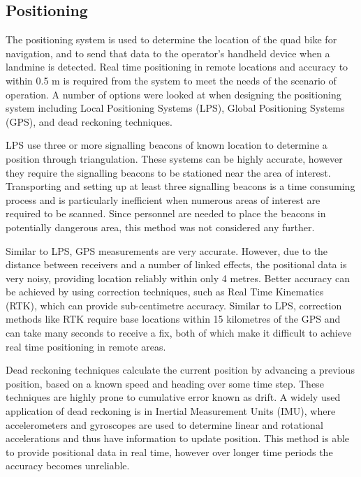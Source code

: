 \documentclass[main.tex]{subfiles}
\begin{document}
\subsection{Positioning}
The positioning system is used to determine the location of the quad bike for navigation, and to send that data to the operator's handheld device when a landmine is detected. Real time positioning in remote locations and accuracy to within 0.5 m is required from the system to meet the needs of the scenario of operation. A number of options were looked at when designing the positioning system including Local Positioning Systems (LPS), Global Positioning Systems (GPS), and dead reckoning techniques.
%
%

LPS use three or more signalling beacons of known location to determine a position through triangulation. These systems can be highly accurate, however they require the signalling beacons to be stationed near the area of interest. Transporting and setting up at least three signalling beacons is a time consuming process and is particularly inefficient when numerous areas of interest are required to be scanned. Since personnel are needed to place the beacons in potentially dangerous area, this method was not considered any further. 

Similar to LPS, GPS measurements are very accurate. However, due to the distance between receivers and a number of linked effects, the positional data is very noisy, providing location reliably within only 4 metres. Better accuracy can be achieved by using correction techniques, such as Real Time Kinematics (RTK), which can provide sub-centimetre accuracy. Similar to LPS, correction methods like RTK require base locations within 15 kilometres of the GPS and can take many seconds to receive a fix, both of which make it difficult to achieve real time positioning in remote areas.
%

Dead reckoning techniques calculate the current position by advancing a previous position, based on a known speed and heading over some time step. These techniques are highly prone to cumulative error known as drift. A widely used application of dead reckoning is in Inertial Measurement Units (IMU), where accelerometers and gyroscopes are used to determine linear and rotational accelerations and thus have information to update position. This method is able to provide positional data in real time, however over longer time periods the accuracy becomes unreliable.
%
\end{document}
